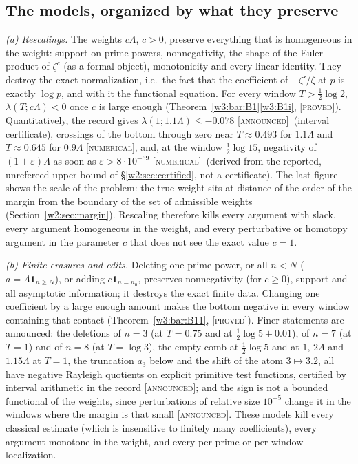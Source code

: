 \documentclass[11pt]{amsart}
\theoremstyle{definition}
\theoremstyle{remark}
\numberwithin{equation}{section}
\newcommand{\stag}[1]{\textsc{[#1]}}
\newcommand{\PROVED}{\stag{proved}}
\newcommand{\NUM}{\stag{numerical}}
\newcommand{\ANNOUNCED}{\stag{announced}}
\newcommand{\entry}[1]{\par\smallskip\noindent\textit{#1.}\enspace}
\begin{document}
\subsection{The models, organized by what they preserve}\label{w3:subsec:models}

\entry{(a) Rescalings} The weights $c\Lambda$, $c>0$, preserve everything that is homogeneous in the weight:
support on prime powers, nonnegativity, the shape of the Euler product of $\zeta^c$ (as a formal object),
monotonicity and every linear identity. They destroy the exact normalization, i.e.\ the fact that the
coefficient of $-\zeta'/\zeta$ at $p$ is exactly $\log p$, and with it the functional equation. For every
window $T>\frac12\log2$, $\lambda(T;c\Lambda)<0$ once $c$ is large enough (Theorem~\ref{w3:bar:B1}\ref{w3:B1i},
\PROVED). Quantitatively, the record gives $\lambda(1;1.1\Lambda)\le-0.078$ \ANNOUNCED\ (interval certificate),
crossings of the bottom through zero near $T\approx0.493$ for $1.1\Lambda$ and $T\approx0.645$ for
$0.9\Lambda$ \NUM, and, at the window $\frac12\log 15$, negativity of $(1+\varepsilon)\Lambda$ as soon as
$\varepsilon>8\cdot10^{-69}$ \NUM\ (derived from the reported, unrefereed upper bound of \S\ref{w2:sec:certified}, not a certificate).
The last figure shows the scale of the problem: the true weight sits at distance of the order of the margin from
the boundary of the set of admissible weights (Section~\ref{w2:sec:margin}). Rescaling therefore kills every
argument with slack, every argument homogeneous in the weight, and every perturbative or homotopy argument in
the parameter $c$ that does not see the exact value $c=1$.

\entry{(b) Finite erasures and edits} Deleting one prime power, or all $n<N$
($a=\Lambda\mathbf 1_{n\ge N}$), or adding $c\mathbf 1_{n=n_0}$, preserves nonnegativity (for $c\ge0$), support
and all asymptotic information; it destroys the exact finite data. Changing one coefficient by a large enough
amount makes the bottom negative in every window containing that contact (Theorem~\ref{w3:bar:B11},
\PROVED). Finer statements are announced: the deletions of $n=3$ (at $T=0.75$ and at $\frac12\log5+0.01$), of
$n=7$ (at $T=1$) and of $n=8$ (at $T=\log3$), the empty comb at $\frac12\log5$ and at $1$, $2\Lambda$ and
$1.15\Lambda$ at $T=1$, the truncation $a_3$ below and the shift of the atom $3\mapsto3.2$, all have negative
Rayleigh quotients on explicit primitive test functions, certified by interval arithmetic in the record
\ANNOUNCED; and the sign is not a bounded functional of the weights, since perturbations of relative size
$10^{-5}$ change it in the windows where the margin is that small \ANNOUNCED. These models kill every classical
estimate (which is insensitive to finitely many coefficients), every argument monotone in the weight, and
every per-prime or per-window localization.
\end{document}

